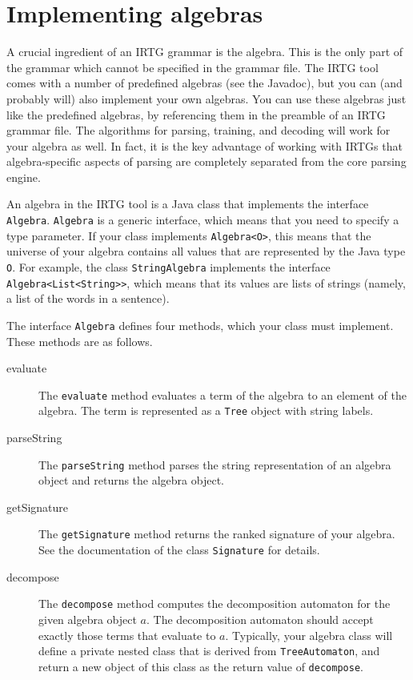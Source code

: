 \documentclass[11pt]{article}
\begin{document}
\section{Implementing algebras} \label{sec:algebra}

A crucial ingredient of an IRTG grammar is the algebra. This is the
only part of the grammar which cannot be specified in the grammar
file. The IRTG tool comes with a number of predefined algebras (see
the Javadoc), but you can (and probably will) also implement your own
algebras. You can use these algebras just like the predefined
algebras, by referencing them in the preamble of an IRTG grammar
file. The algorithms for parsing, training, and decoding will work for
your algebra as well. In fact, it is the key advantage of working with
IRTGs that algebra-specific aspects of parsing are completely
separated from the core parsing engine.

An algebra in the IRTG tool is a Java class that implements the
interface \verb?Algebra?.  \verb?Algebra? is a generic interface,
which means that you need to specify a type parameter.  If your class
implements \verb?Algebra<O>?, this means that the universe of your
algebra contains all values that are represented by the Java type
\verb?O?.  For example, the class \verb?StringAlgebra? implements the
interface \verb?Algebra<List<String>>?, which means that its values
are lists of strings (namely, a list of the words in a sentence).

The interface \verb?Algebra? defines four methods, which your class
must implement. These methods are as follows.

\begin{description}
\item[evaluate] The \verb?evaluate? method evaluates a term of the
  algebra to an element of the algebra. The term is represented as a
  \verb?Tree? object with string labels.
\item[parseString] The \verb?parseString? method parses the string
  representation of an algebra object and returns the algebra
  object.
\item[getSignature] The \verb?getSignature? method returns the ranked
  signature of your algebra. See the documentation of the class
  \verb?Signature? for details.
\item[decompose] The \verb?decompose? method computes the
  decomposition automaton for the given algebra object $a$. The
  decomposition automaton should accept exactly those terms that
  evaluate to $a$. Typically, your algebra class will define a private
  nested class that is derived from \verb?TreeAutomaton?, and return a
  new object of this class as the return value of \verb?decompose?.
\end{description}
\end{document}
